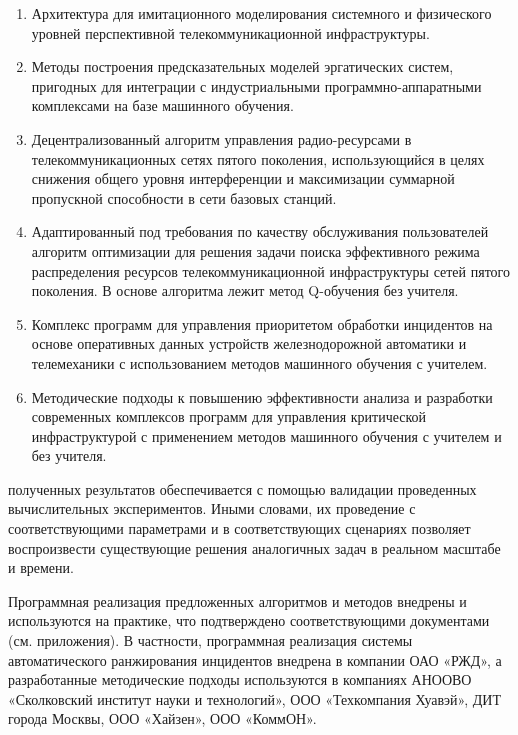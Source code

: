 {}
\begin{enumerate}
  \item Архитектура для имитационного моделирования системного и физического уровней перспективной телекоммуникационной инфраструктуры.
  \item Методы построения предсказательных моделей эргатических систем, пригодных для интеграции с индустриальными программно-аппаратными комплексами на базе машинного обучения.
  \item Децентрализованный алгоритм управления радио-ресурсами в телекоммуникационных сетях пятого поколения, использующийся в целях снижения общего уровня интерференции и максимизации суммарной пропускной способности в сети базовых станций.
  \item Адаптированный под требования по качеству обслуживания пользователей алгоритм оптимизации для решения задачи поиска эффективного режима распределения ресурсов телекоммуникационной инфраструктуры сетей пятого поколения. В основе алгоритма лежит метод Q-обучения без учителя.
  \item Комплекс программ для управления приоритетом обработки инцидентов на основе оперативных данных устройств железнодорожной автоматики и телемеханики с использованием методов машинного обучения с учителем.
  \item Методические подходы к повышению эффективности анализа и разработки современных комплексов программ для управления критической инфраструктурой с применением методов машинного обучения с учителем и без учителя.
\end{enumerate}

{\reliability} полученных результатов обеспечивается с помощью валидации проведенных вычислительных экспериментов. Иными словами, их проведение с соответствующими параметрами и в соответствующих сценариях позволяет воспроизвести существующие решения аналогичных задач в реальном масштабе и времени.




Программная реализация предложенных алгоритмов и методов внедрены и используются на практике, что подтверждено соответствующими документами (см. приложения). В частности, программная реализация системы автоматического ранжирования инцидентов внедрена в компании ОАО «РЖД», а разработанные методические подходы используются в компаниях АНООВО «Сколковский институт науки и технологий», ООО «Техкомпания Хуавэй», ДИТ города Москвы, ООО «Хайзен», ООО «КоммОН».

